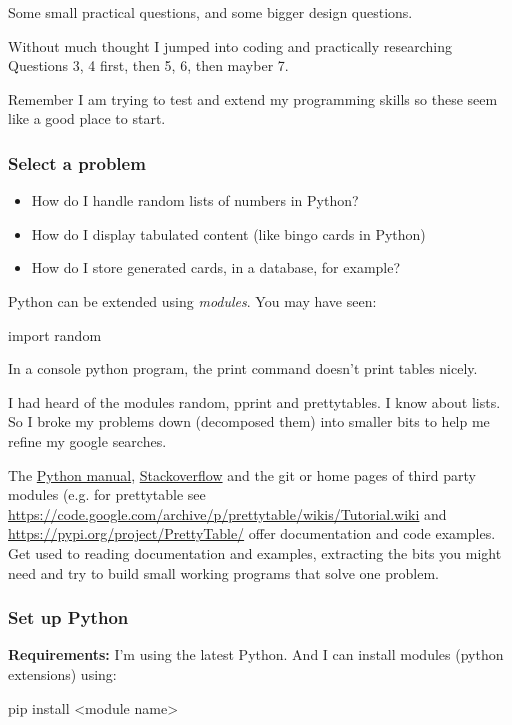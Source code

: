 \documentclass[11pt]{article}
\providecommand{\tightlist}{%
      \setlength{\itemsep}{0pt}\setlength{\parskip}{0pt}}
\begin{document}
Some small practical questions, and some bigger design questions.

Without much thought I jumped into coding and practically researching
Questions 3, 4 first, then 5, 6, then mayber 7.

Remember I am trying to test and extend my programming skills so these
seem like a good place to start.

    \subsubsection{Select a problem}\label{select-a-problem}

    \begin{itemize}
\tightlist
\item
  How do I handle random lists of numbers in Python?
\item
  How do I display tabulated content (like bingo cards in Python)
\item
  How do I store generated cards, in a database, for example?
\end{itemize}

Python can be extended using \emph{modules}. You may have seen:

import random

In a console python program, the print command doesn't print tables
nicely.

I had heard of the modules random, pprint and prettytables. I know about
lists. So I broke my problems down (decomposed them) into smaller bits
to help me refine my google searches.

The \href{https://docs.python.org/3/}{Python manual},
\href{https://stackoverflow.com}{Stackoverflow} and the git or home
pages of third party modules (e.g. for prettytable see
\url{https://code.google.com/archive/p/prettytable/wikis/Tutorial.wiki}
and \url{https://pypi.org/project/PrettyTable/} offer documentation and
code examples. Get used to reading documentation and examples,
extracting the bits you might need and try to build small working
programs that solve one problem.

    \subsubsection{Set up Python}\label{set-up-python}

    \textbf{Requirements:} I'm using the latest Python. And I can install
modules (python extensions) using:

pip install \textless{}module name\textgreater{}
\end{document}
